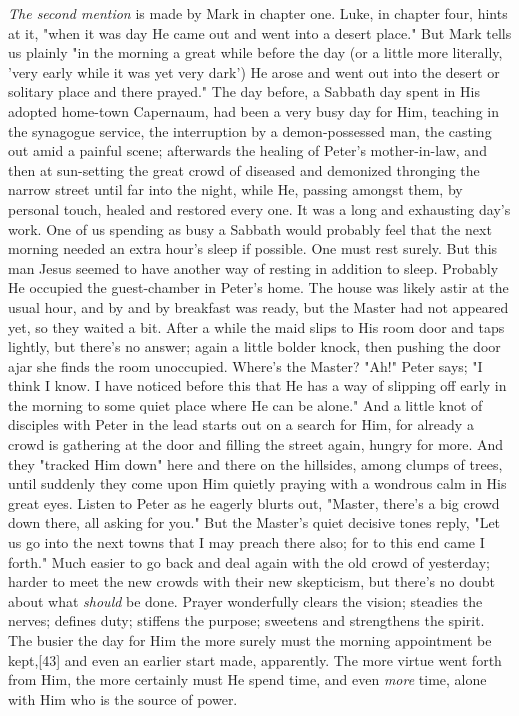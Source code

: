 \textit{The second mention} is made by Mark in chapter one. Luke, in chapter
four, hints at it, "when it was day He came out and went into a desert
place." But Mark tells us plainly "in the morning a great while before the
day (or a little more literally, 'very early while it was yet very dark')
He arose and went out into the desert or solitary place and there prayed."
The day before, a Sabbath day spent in His adopted home-town Capernaum,
had been a very busy day for Him, teaching in the synagogue service, the
interruption by a demon-possessed man, the casting out amid a painful
scene; afterwards the healing of Peter's mother-in-law, and then at
sun-setting the great crowd of diseased and demonized thronging the
narrow street until far into the night, while He, passing amongst them, by
personal touch, healed and restored every one. It was a long and
exhausting day's work. One of us spending as busy a Sabbath would probably
feel that the next morning needed an extra hour's sleep if possible. One
must rest surely. But this man Jesus seemed to have another way of resting
in addition to sleep. Probably He occupied the guest-chamber in Peter's
home. The house was likely astir at the usual hour, and by and by
breakfast was ready, but the Master had not appeared yet, so they waited a
bit. After a while the maid slips to His room door and taps lightly, but
there's no answer; again a little bolder knock, then pushing the door ajar
she finds the room unoccupied. Where's the Master? "Ah!" Peter says; "I
think I know. I have noticed before this that He has a way of slipping off
early in the morning to some quiet place where He can be alone." And a
little knot of disciples with Peter in the lead starts out on a search for
Him, for already a crowd is gathering at the door and filling the street
again, hungry for more. And they "tracked Him down" here and there on the
hillsides, among clumps of trees, until suddenly they come upon Him
quietly praying with a wondrous calm in His great eyes. Listen to Peter as
he eagerly blurts out, "Master, there's a big crowd down there, all asking
for you." But the Master's quiet decisive tones reply, "Let us go into
the next towns that I may preach there also; for to this end came I
forth." Much easier to go back and deal again with the old crowd of
yesterday; harder to meet the new crowds with their new skepticism, but
there's no doubt about what \textit{should} be done. Prayer wonderfully clears
the vision; steadies the nerves; defines duty; stiffens the purpose;
sweetens and strengthens the spirit. The busier the day for Him the more
surely must the morning appointment be kept,[43] and even an earlier start
made, apparently. The more virtue went forth from Him, the more certainly
must He spend time, and even \textit{more} time, alone with Him who is the source
of power.

